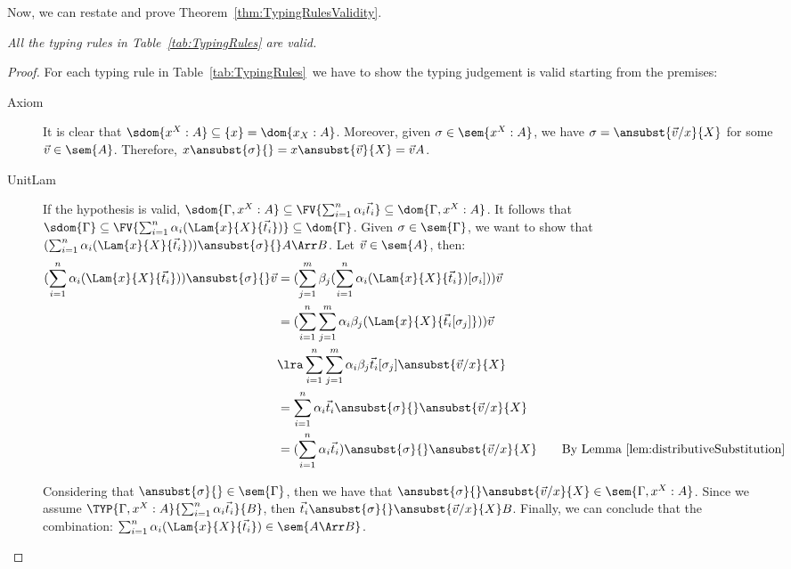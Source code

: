 Now, we can restate and prove Theorem~\ref{thm:TypingRulesValidity}.
\begin{restatetheorem}
  \itshape
  All the typing rules in Table~\ref{tab:TypingRules} are valid.
\end{restatetheorem}
\begin{proof}
    For each typing rule in Table~\ref{tab:TypingRules}~we have to show the typing judgement is valid starting from the premises:
    \begin{description}
    \item[Axiom] It is clear that $\sdom{x^X:A}\subseteq\{x\}=\dom{x_X:A}$. Moreover, given $\sigma\in\sem{x^X:A}$, we have $\sigma=\ansubst{\vec v/x}{X}$ for some $\vec{v}\in\sem{A}$. Therefore, $x\ansubst{\sigma}{}=x\ansubst{\vec v}{X}=\vec{v}\real A$.
    
    \item[UnitLam] If the hypothesis is valid, $\sdom{\Gamma,x^X:A}\subseteq \FV{\sum_{i=1}^{n}\alpha_i \vec{t}_{i}}\subseteq \dom{\Gamma,x^X:A}$. It follows that $\sdom{\Gamma}\subseteq \FV{\sum_{i=1}^{n}\alpha_i (\Lam{x}{X}{\vec{t}_{i}})}\subseteq \dom{\Gamma}$. Given $\sigma\in\sem{\Gamma}$, we want to show that $(\sum_{i=1}^{n}\alpha_i (\Lam{x}{X}{\vec{t}_{i}}))\ansubst{\sigma}{}\real A\Arr B$. Let $\vec v\in\sem{A}$, then:
    \begin{align*}
        (\sum_{i=1}^{n} \alpha_i(\Lam{x}{X}{\vec{t}_{i}}))\ansubst{\sigma}{} \vec v&= (\sum_{j=1}^{m} \beta_j (\sum_{i=1}^{n} \alpha_i (\Lam{x}{X}{\vec{t}_{i}}) [\sigma_i])) \vec{v} \\
        &= (\sum_{i=1}^{n}\sum_{j=1}^{m}\alpha_i\beta_j (\Lam{x}{X}{\vec{t}_{i}[\sigma_j]}))\vec v\\
        &\lra \sum_{i=1}^{n}\sum_{j=1}^{m}\alpha_i\beta_j \vec{t}_{i}[\sigma_j]\ansubst{\vec v/x}{X}\\
        &=\sum_{i=1}^{n}\alpha_i \vec{t}_{i}\ansubst{\sigma}{}\ansubst{\vec v/x}{X}\\
        &=(\sum_{i=1}^{n}\alpha_i \vec{t}_{i})\ansubst{\sigma}{}\ansubst{\vec v/x}{X}\qquad{\text{By Lemma~\ref{lem:distributiveSubstitution}}}
    \end{align*}
    
    Considering that $\ansubst{\sigma}{}\in\sem{\Gamma}$, then we have that $\ansubst{\sigma}{}\ansubst{\vec v/x}{X}\in\sem{\Gamma,x^X:A}$. Since we assume $\TYP{\Gamma, x^X:A}{\sum_{i=1}^{n}\alpha_i\vec{t}_{i}}{B}$, then $\vec{t}_{i}\ansubst{\sigma}{}\ansubst{\vec v/x}{X}\real B$. Finally, we can conclude that the combination: $\sum_{i=1}^{n}\alpha_i (\Lam{x}{X}{\vec{t}_{i}})\in\sem{A\Arr B}$.


\end{description}
\end{proof}
